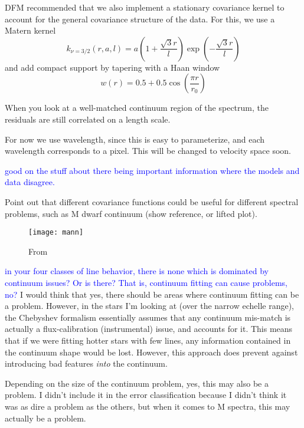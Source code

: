 \documentclass[preprint]{aastex} %
\newcommand{\hcom}[1]{ \textcolor{Blue}{#1}}
\begin{document}
DFM recommended that we also implement a stationary covariance kernel to account for the general covariance structure of the data. For this, we use a Matern kernel \begin{equation}
  k_{\nu = 3/2}(r, a, l) = a \left(1 + \frac{\sqrt{3} r}{l} \right ) \exp \left (- \frac{\sqrt{3} r}{l} \right ) 
\end{equation}
and add compact support by tapering with a Haan window
\begin{equation}
  w(r) = 0.5 + 0.5 \cos \left( \frac{\pi r}{r_0} \right)
\end{equation}

When you look at a well-matched continuum region of the spectrum, the residuals are still correlated on a length scale.

For now we use wavelength, since this is easy to parameterize, and each wavelength corresponds to a pixel. This will be changed to velocity space soon.

\hcom{good on the stuff about there being important information where the models and data disagree.}

Point out that different covariance functions could be useful for different spectral problems, such as M dwarf continuum (show reference, or lifted plot).

\begin{figure}[!htb]
\begin{center}
\texttt{[image: mann]}
\caption{From \citet{mga13}}
\label{fig:mann}
\end{center}
\end{figure}


\hcom{in your four classes of line behavior, there is none which is dominated by continuum issues? Or is there? That is, continuum fitting can cause problems, no?}
I would think that yes, there should be areas where continuum fitting can be a problem. However, in the stars I'm looking at (over the narrow echelle range), the Chebyshev formalism essentially assumes that any continuum mis-match is actually a flux-calibration (instrumental) issue, and accounts for it. This means that if we were fitting hotter stars with few lines, any information contained in the continuum shape would be lost. However, this approach does prevent against introducing bad features \emph{into} the continuum.

Depending on the size of the continuum problem, yes, this may also be a problem. I didn't include it in the error classification because I didn't think it was as dire a problem as the others, but when it comes to M spectra, this may actually be a problem.
\end{document}
